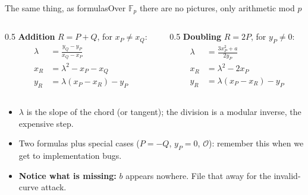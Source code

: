 \ifdefined\PRESENTATION\else\PassOptionsToClass{handout}{beamer}\fi\documentclass[aspectratio=169, lualatex]{beamer}
\begin{document}
\begin{frame}{The same thing, as formulas}{Over $\mathbb{F}_p$ there are no pictures, only arithmetic mod $p$}
	\begin{columns}[c]
		\begin{column}{0.5\textwidth}
			\textbf{Addition} $R = P + Q$, for $x_P \neq x_Q$:
			\begin{align*}
				\lambda & = \frac{y_Q - y_P}{x_Q - x_P} \\
				x_R     & = \lambda^2 - x_P - x_Q      \\
				y_R     & = \lambda (x_P - x_R) - y_P
			\end{align*}
		\end{column}
		\begin{column}{0.5\textwidth}
			\textbf{Doubling} $R = 2P$, for $y_P \neq 0$:
			\begin{align*}
				\lambda & = \frac{3x_P^2 + a}{2y_P}   \\
				x_R     & = \lambda^2 - 2x_P          \\
				y_R     & = \lambda (x_P - x_R) - y_P
			\end{align*}
		\end{column}
	\end{columns}
	\vspace{0.1cm}
	\begin{itemize}
		\item $\lambda$ is the slope of the chord (or tangent); the division is a modular inverse, the expensive step.
		\item Two formulas plus special cases ($P = -Q$, $y_P = 0$, $\mathcal{O}$): remember this when we get to implementation bugs.
		\item \textbf{Notice what is missing:} $b$ appears nowhere. File that away for the invalid-curve attack.
	\end{itemize}
\end{frame}
\end{document}
